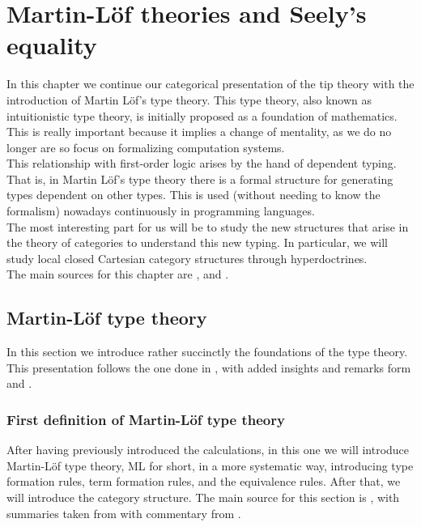 
\chapter{Martin-L\"of theories and Seely's equality}
\label{chap:5}
\thispagestyle{empty}



In this chapter we continue our categorical presentation of the tip theory with the introduction of Martin L\"of's type theory. This type theory, also known as intuitionistic type theory, is initially proposed as a foundation of mathematics. This is really important because it implies a change of mentality, as we do no longer are so focus on formalizing computation systems. \\

This relationship with first-order logic arises by the hand of dependent typing. That is, in Martin Löf's type theory there is a formal structure for generating types dependent on other types. This is used (without needing to know the formalism) nowadays continuously in programming languages. \\

The most interesting part for us will be to study the new structures that arise in the theory of categories to understand this new typing. In particular, we will study local closed Cartesian category structures through hyperdoctrines. \\

The main sources for this chapter are  \cite{seely1984locally}, \cite{martinlof1973intuitionistic}  and \cite{mac2013categories}.



\section{Martin-Löf type theory}

In this section we introduce rather succinctly the foundations of the type theory. This presentation follows the one done in \cite{seely1984locally}, with added insights and remarks form \cite{martinlof1973intuitionistic} and \cite{sep-type-theory-intuitionistic}.



\subsection{First definition of Martin-Löf type theory}

After having previously introduced the calculations, in this one we will introduce Martin-L\"of type theory, ML for short, in a more systematic way, introducing type formation rules, term formation rules, and the equivalence rules. After that, we will introduce the category structure. The main source for this section is \cite{martinlof1973intuitionistic}, with summaries taken from \cite{seely1984locally} with commentary from .\\

